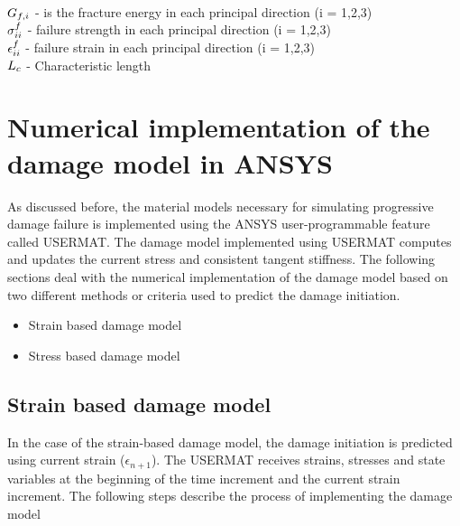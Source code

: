 \documentclass[a4paper,12pt,twoside]{report}
\begin{document}
\\ 
\\ 
\\
$\mathlarger{G_{f,i}}$ \; - \;is the fracture energy in each principal direction (i = 1,2,3)  \\ $\mathlarger{\sigma_{ii}^{f}}$ \;\;\; -  \;  failure strength in each principal direction (i = 1,2,3) \\ $\mathlarger{\epsilon_{ii}^{f}}$\;\;\;\;\; - \; failure strain in each principal direction (i = 1,2,3) \\ $\mathlarger{L_{c}}$\;\;\;\;\; - \; Characteristic length

\section{Numerical implementation of the damage model in ANSYS}
\indent\indent\indent  As discussed before, the material models necessary for simulating progressive damage failure is implemented using the ANSYS user-programmable feature called USERMAT. The damage model implemented using USERMAT computes and updates the current stress and consistent tangent stiffness. The following sections deal with the numerical implementation of the damage model based on two different methods or criteria used to predict the damage initiation.
\\
\begin{itemize}
\item Strain based damage model 
\item Stress based damage model 
\end{itemize}
\subsection{Strain based damage model}
\indent\indent\indent  In the case of the strain-based damage model, the damage initiation is predicted using current strain ($\epsilon_{n+1}$).   The USERMAT receives strains, stresses and state variables at the beginning of the time increment and the current strain increment. The following steps describe the process of implementing the damage model
\end{document}
